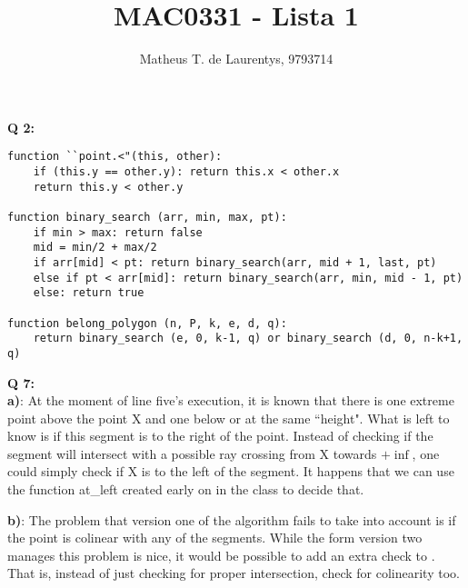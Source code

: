 \documentclass[]{article}
\title{\vspace{-4.0cm}MAC0331 - Lista 1}
\author{Matheus T. de Laurentys, 9793714}
\begin{document}
	\maketitle
	\noindent
	\textbf{Q 2:} \\
	\begin{lstlisting}
function ``point.<"(this, other):
	if (this.y == other.y): return this.x < other.x
	return this.y < other.y

function binary_search (arr, min, max, pt):
	if min > max: return false
	mid = min/2 + max/2
	if arr[mid] < pt: return binary_search(arr, mid + 1, last, pt)
	else if pt < arr[mid]: return binary_search(arr, min, mid - 1, pt)
	else: return true
	
function belong_polygon (n, P, k, e, d, q):
	return binary_search (e, 0, k-1, q) or binary_search (d, 0, n-k+1, q)
	\end{lstlisting}
	
	\noindent
	\textbf{Q 7:} \\
	\textbf{a)}: At the moment of line five's execution, it is known that there is one extreme point above the point X and one below or at the same ``height". What is left to know is if this segment is to the right of the point. Instead of checking if the segment will intersect with a possible ray crossing from X towards $+\inf$, one could simply check if X is to the left of the segment. It happens that we can use the function at\_left created early on in the class to decide that.
	
	\noindent
	\textbf{b)}: The problem that version one of the algorithm fails to take into account is if the point is colinear with any of the segments. While the form version two manages this problem is nice, it would be possible to add an extra check to . That is, instead of just checking for proper intersection, check for colinearity too.
\end{document}
